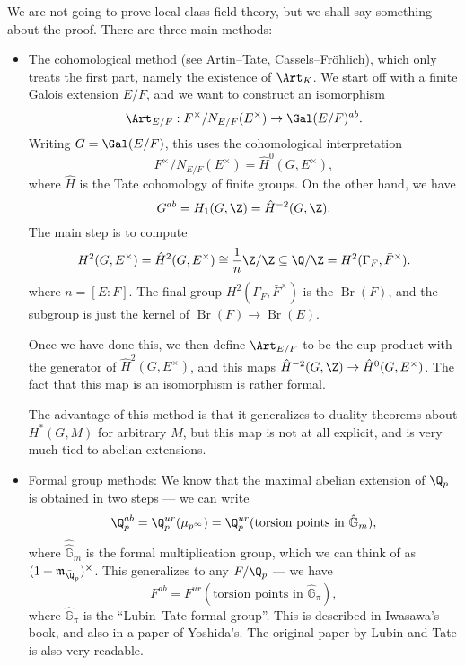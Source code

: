 \documentclass[a4paper]{article}
\DeclareMathOperator\Br{Br}
\renewcommand\G{\hat{\mathbb{G}}}
\begin{document}
We are not going to prove local class field theory, but we shall say something about the proof. There are three main methods:
\begin{itemize}
  \item The cohomological method (see Artin--Tate, Cassels--Fr\"ohlich), which only treats the first part, namely the existence of $\Art_K$. We start off with a finite Galois extension $E/F$, and we want to construct an isomorphism
    \[
      \Art_{E/F}: F^\times/N_{E/F}(E^\times) \to \Gal(E/F)^{ab}.
    \]
    Writing $G = \Gal(E/F)$, this uses the cohomological interpretation
    \[
      F^\times/N_{E/F}(E^\times) = \hat{H}^0(G, E^\times),
    \]
    where $\hat{H}$ is the Tate cohomology of finite groups. On the other hand, we have
    \[
      G^{ab} = H_1(G, \Z) = \hat{H}^{-2}(G, \Z).
    \]
    The main step is to compute
    \[
      H^2(G, E^\times) = \hat{H}^2(G, E^\times) \cong \frac{1}{n}\Z/\Z \subseteq \Q/\Z = H^2(\Gamma_F, \bar{F}^\times).
    \]
    where $n = [E:F]$. The final group $H^2(\Gamma_F, \bar{F}^\times)$ is the  $\Br(F)$, and the subgroup is just the kernel of $\Br(F) \to \Br(E)$.

    Once we have done this, we then define $\Art_{E/F}$ to be the cup product with the generator of $\hat{H}^2(G, E^\times)$, and this maps $\hat{H}^{-2}(G, \Z) \to \hat{H}^0(G, E^\times)$. The fact that this map is an isomorphism is rather formal.

    The advantage of this method is that it generalizes to duality theorems about $H^*(G, M)$ for arbitrary $M$, but this map is not at all explicit, and is very much tied to abelian extensions.
  \item Formal group methods: We know that the maximal abelian extension of $\Q_p$ is obtained in two steps --- we can write
    \[
      \Q_p^{ab} = \Q_p^{ur}(\mu_{p^\infty}) = \Q_p^{ur} (\text{torsion points in }\G_m),
    \]
    where $\hat{\G}_m$ is the formal multiplication group, which we can think of as $(1 + \mathfrak{m}_{\bar{\Q}_p})^\times$. This generalizes to any $F/\Q_p$ --- we have
    \[
      F^{ab} = F^{ur}(\text{torsion points in }\G_\pi),
    \]
    where $\G_\pi$ is the ``Lubin--Tate formal group''. This is described in Iwasawa's book, and also in a paper of Yoshida's. The original paper by Lubin and Tate is also very readable.


\end{itemize}
\end{document}
